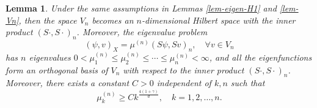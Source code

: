 \documentclass[11pt]{article}
\newtheorem{lemma}{Lemma}[section]
\numberwithin{equation}{section}
\begin{document}
\begin{lemma}\label{lem-eigen-Sn}
Under the same assumptions in Lemmas \ref{lem-eigen-H1} and \ref{lem-Vn}, then the space $V_n$ becomes an $n$-dimensional Hilbert space with the inner product $(S\cdot,S\cdot)_n$. Moreover, the eigenvalue problem
\begin{equation}\label{eigen-Vn}
( \psi, v )_{X} = \mu^{(n)} ( S \psi, S v )_n, \quad \forall v \in V_n
\end{equation}
has $ n $ eigenvalues $0< \mu_1^{(n)} \leq \mu_2^{(n)}  \leq \cdots \leq \mu_n^{(n)} <\infty$, and all the eigenfunctions form an orthogonal basis of $ V_n $ with respect to the inner product $ ( S \cdot, S\cdot)_n $. Moreover, there exists a constant $ C > 0 $ independent of $ k ,n$ such that
$$
\mu_k^{(n)} \geq C k^{\frac{4(1+\gamma)}{d}},\quad k = 1, 2, \ldots, n.
$$
\end{lemma}
\end{document}
